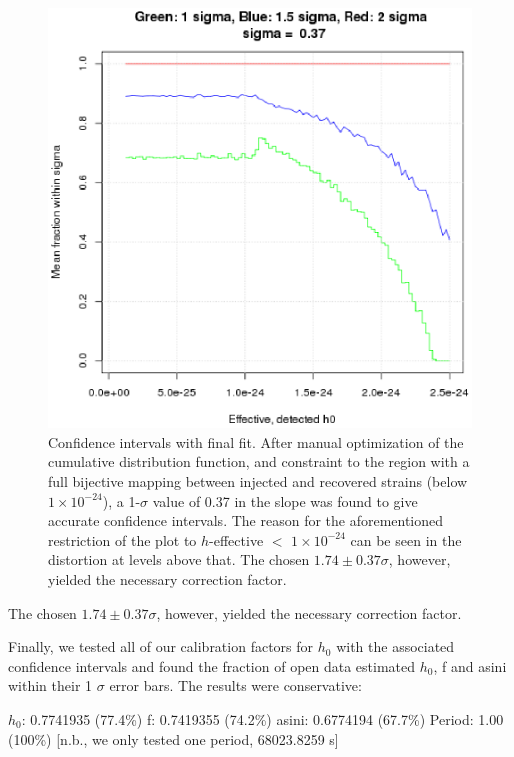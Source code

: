 \begin{figure}
\begin{center}
\includegraphics[width=0.3\paperwidth,height=0.2\paperheight]{PlotSigmaDiffVsH0Eff.eps}
\caption{Confidence intervals with final fit. After manual optimization of the cumulative distribution function, and constraint to the region with a full bijective mapping between injected and recovered strains (below $1 \times 10^{-24}$), a 1-$\sigma$ value of 0.37 in the slope was found to give accurate confidence intervals.
The reason for the aforementioned restriction of the plot to $h$-effective $<$ $1 \times 10^{-24}$ can be seen in the distortion at levels above that. The chosen $1.74 \pm 0.37 \sigma$, however, yielded the necessary correction factor. \label{fig:plotsigmadiffvsh0eff}
}
\end{center}
\end{figure}

The chosen $1.74 \pm 0.37 \sigma$, however, yielded the necessary correction factor.

Finally, we tested all of our calibration factors for $h_0$ with the associated confidence intervals and found the fraction of open data estimated $h_0$, f and asini within their 1 $\sigma$ error bars. The results were conservative:

$h_0$: 0.7741935 (77.4\%)
f: 0.7419355 (74.2\%)
asini: 0.6774194 (67.7\%)
Period: 1.00 (100\%) [n.b., we only tested one period, 68023.8259 s]


